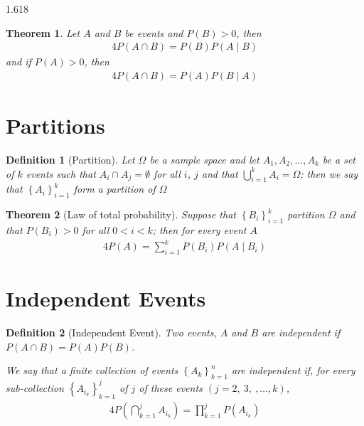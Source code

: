 \documentclass[11pt, oneside]{book}   	%
\newtheorem{definition}{Definition}[chapter]
\newtheorem{theorem}{Theorem}[chapter]
\newcommand{\set}[1]{\left\{#1\right\}}
\begin{document}
\begin{spacing}{1.618}
		\begin{theorem}
			Let $A$ and $B$ be events and $P(B)>0$, then
			\begin{alignat}{4}
				P(A\cap B)=P(B)P(A\mid B)
			\end{alignat}
			and if $P(A)>0$, then 
			\begin{alignat}{4}
				P(A\cap B)=P(A)P(B\mid A)
			\end{alignat}
		\end{theorem}
	\section{Partitions}
	

		\begin{definition}[Partition]
			Let $\Omega$ be a sample space and let $A_1, A_2, \dots, A_k$ be a set of $k$ events such that $A_i \cap A_j = \emptyset$ for all $i$, $j$ and that $\bigcup_{i=1}^k A_i = \Omega$; then we say that $\left\{A_i\right\}_{i=1}^k$ form a \emph{partition} of $\Omega$
		\end{definition}
		
		\begin{theorem}[Law of total probability]
			Suppose that $\set{B_i}_{i=1}^k$ partition $\Omega$ and that $P(B_i)>0$ for all $0<i<k$; then for every event $A$
			\begin{alignat}{4}
				P(A)=\sum_{i=1}^kP(B_i)P(A\mid B_i)
			\end{alignat}
		\end{theorem}

	\section{Independent Events}
	
		\begin{definition}[Independent Event]
			Two events, $A$ and $B$ are \emph{independent} if $P(A\cap B) = P(A)P(B)$. 

			We say that a finite collection of events $\set{A_k}_{k=1}^n$ are independent if, for every sub-collection $\set{A_{i_k}}_{k=1}^j$ of $j$ of these events $(j=2,~3,~, \dots, k)$,
			\begin{alignat}{4}
				P\left(\bigcap_{k=1}^j A_{i_k}\right) = \prod_{k=1}^j P(A_{i_k})
			\end{alignat}

		\end{definition}
		

\end{spacing}
\end{document}

